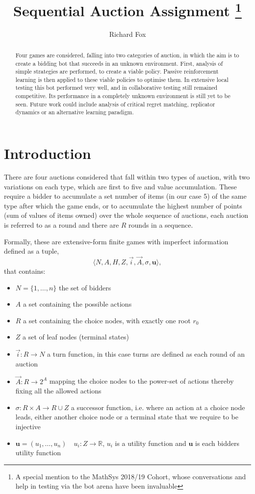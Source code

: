 \documentclass[10pt,conference,twocolumn]{IEEEtran}
\title{Sequential Auction Assignment \thanks{A special mention to the MathSys 2018/19 Cohort, whose conversations and help in testing via the bot arena have been invaluable}}
\author{Richard Fox
\IEEEauthorblockA{\\ Mathematics for Real-World Systems Centre for Doctoral Training\\Warwick Mathematics Institute\\University of Warwick\\richard.fox@warwick.ac.uk}
}
\date{}
\begin{document}
\maketitle

\begin{abstract}
   Four games are considered, falling into two categories of auction, in which the aim is to create a bidding bot that succeeds in an unknown environment. First, analysis of simple strategies are performed, to create a viable policy. Passive reinforcement learning is then applied to these viable policies to optimise them. In extensive local testing this bot performed very well, and in collaborative testing still remained competitive. Its performance in a completely unknown environment is still yet to be seen. Future work could include analysis of critical regret matching, replicator dynamics or an alternative learning paradigm.
\end{abstract}

\section{Introduction}

There are four auctions considered that fall within two types of auction, with two variations on each type, which are first to five and value accumulation. These require a bidder to accumulate a set number of items (in our case 5) of the same type after which the game ends, or to accumulate the highest number of points (sum of values of items owned) over the whole sequence of auctions, each auction is referred to as a round and there are $R$ rounds in a sequence. 


Formally, these are extensive-form finite games with imperfect information defined as a tuple,
$$\langle N, A, H, Z, \vec{i}, \vec{A},\sigma,\mathbf{u} \rangle , $$
that contains:
\begin{itemize}
    \item $N = \{1,\dots , n \}$ the set of bidders
    \item $A$ a set containing the possible actions
    \item $R$ a set containing the choice nodes, with exactly one root $r_0$
    \item $Z$ a set of leaf nodes (terminal states)
    \item $\vec{i} :R \rightarrow N$ a turn function, in this case turns are defined as each round of an auction 
    \item $\vec{A} : R \rightarrow 2^A$ mapping the choice nodes to the power-set of actions thereby fixing all the allowed actions
    \item $\sigma : R \times A \rightarrow R \cup Z$ a successor function, i.e. where an action at a choice node leads, either another choice node or a terminal state that we require to be injective
    \item $\mathbf{u} = (u_1,\dots,u_n)\quad u_i : Z \rightarrow \mathbb{R}$, $u_i$ is a utility function and $\mathbf{u}$ is each bidders utility function
\end{itemize}
\end{document}
